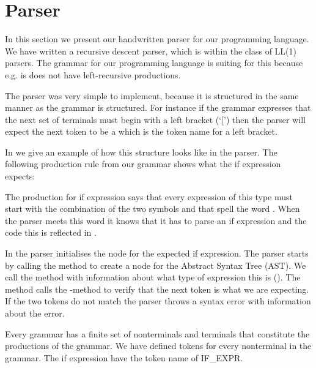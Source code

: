 \section{Parser}

In this section we present our handwritten parser for our programming language. We have written a recursive descent parser, which is within the class of LL(1) parsers. The grammar for our programming language is suiting for this because e.g. is does not have left-recursive productions. 

The parser was very simple to implement, because it is structured in the same manner as the grammar is structured. For instance if the grammar expresses that the next set of terminals must begin with a left bracket (`[') then the parser will expect the next token to be a  which is the token name for a left bracket. 

In  we give an example of how this structure looks like in the parser. The following production rule from our grammar shows what the if expression expects:

\begin{ebnf}
\end{ebnf}

The production for if expression says that every expression of this type must start with the combination of the two symbols  and  that spell the word . When the parser meets this word it knows that it has to parse an if expression and the code this is reflected in .



In  the parser initialises the node for the expected if expression. The parser starts by calling the method  to create a node for the Abstract Syntax Tree (AST). We call the method with information about what type of expression this is (). The method calls the -method to verify that the next token is what we are expecting. If the two tokens do not match the parser throws a syntax error with information about the error.

Every grammar has a finite set of nonterminals and terminals that constitute the productions of the grammar. We have defined tokens for every nonterminal in the grammar. The if expression have the token name of IF\_EXPR. 

